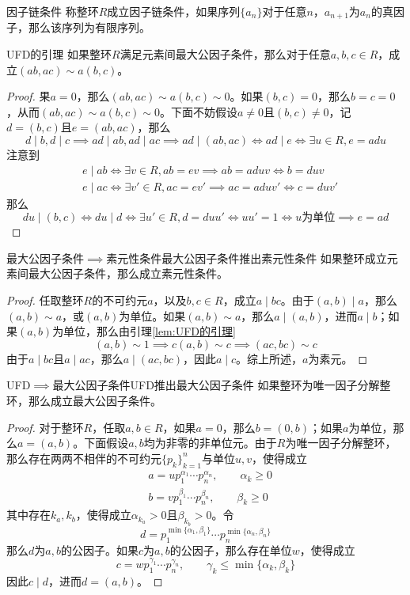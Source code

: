 \documentclass[lang = cn, scheme = chinese, thmcnt = section]{elegantbook}
\begin{document}
\begin{definition}{因子链条件}
	称整环$R$成立因子链条件，如果序列$\{a_n\}$对于任意$n$，$a_{n+1}$为$a_{n}$的真因子，那么该序列为有限序列。
\end{definition}

\begin{lemma}{}{UFD的引理}
	如果整环$R$满足元素间最大公因子条件，那么对于任意$a,b,c\in R$，成立$(ab,ac)\sim a(b,c)$。
\end{lemma}

\begin{proof}
	果$a=0$，那么$(ab,ac)\sim a(b,c)\sim 0$。如果$(b,c)=0$，那么$b=c=0$，从而$(ab,ac)\sim a(b,c)\sim 0$。下面不妨假设$a\ne 0$且$(b,c)\ne 0$，记$d=(b,c)$且$e=(ab,ac)$，那么
	$$
	d\mid b,d\mid c\implies ad\mid ab,ad\mid ac\implies ad\mid (ab,ac)\iff ad\mid e\iff \exists u\in R,e=adu
	$$
	注意到
	\begin{align*}
		&e\mid ab\iff \exists v\in R,ab=ev\implies ab=aduv\iff b=duv\\
		&e\mid ac\iff \exists v'\in R,ac=ev'\implies ac=aduv'\iff c=duv'
	\end{align*}
	那么
	$$
	du\mid (b,c)\iff du\mid d\iff \exists u'\in R,d=duu'\iff uu'=1\iff u\text{为单位}\implies e=ad
	$$
\end{proof}

\begin{theorem}{最大公因子条件$\implies$素元性条件}{最大公因子条件推出素元性条件}
	如果整环成立元素间最大公因子条件，那么成立素元性条件。
\end{theorem}

\begin{proof}
	任取整环$R$的不可约元$a$，以及$b,c\in R$，成立$a\mid bc$。由于$(a,b)\mid a$，那么$(a,b)\sim a$，或$(a,b)$为单位。如果$(a,b)\sim a$，那么$a\mid (a,b)$，进而$a\mid b$；如果$(a,b)$为单位，那么由引理\ref{lem:UFD的引理}
	$$
	(a,b)\sim 1\implies c(a,b)\sim c\implies (ac,bc)\sim c
	$$
	由于$a\mid bc$且$a\mid ac$，那么$a\mid (ac,bc)$，因此$a\mid c$。综上所述，$a$为素元。
\end{proof}

\begin{theorem}{UFD$\implies$最大公因子条件}{UFD推出最大公因子条件}
	如果整环为唯一因子分解整环，那么成立最大公因子条件。
\end{theorem}

\begin{proof}
	对于整环$R$，任取$a,b\in R$，如果$a=0$，那么$b=(0,b)$；如果$a$为单位，那么$a=(a,b)$。下面假设$a,b$均为非零的非单位元。由于$R$为唯一因子分解整环，那么存在两两不相伴的不可约元$\{p_k\}_{k=1}^{n}$与单位$u,v$，使得成立
	\begin{align*}
		&a=up_1^{\alpha_1}\cdots p_n^{\alpha_n},\qquad  \alpha_k\ge 0\\
		&b=vp_1^{\beta_1}\cdots p_n^{\beta_n},\qquad \beta_k\ge 0
	\end{align*}
	其中存在$k_a,k_b$，使得成立$\alpha_{k_a}>0$且$\beta_{k_b}>0$。令
	$$
	d=p_1^{\min\{\alpha_1,\beta_1\}}\cdots p_n^{\min\{\alpha_n,\beta_n\}}
	$$
	那么$d$为$a,b$的公因子。如果$c$为$a,b$的公因子，那么存在单位$w$，使得成立
	$$
	c=wp_1^{\gamma_1}\cdots p_n^{\gamma_n},\qquad \gamma_k\le\min\{ \alpha_k,\beta_k \}
	$$
	因此$c\mid d$，进而$d=(a,b)$。
\end{proof}
\end{document}
